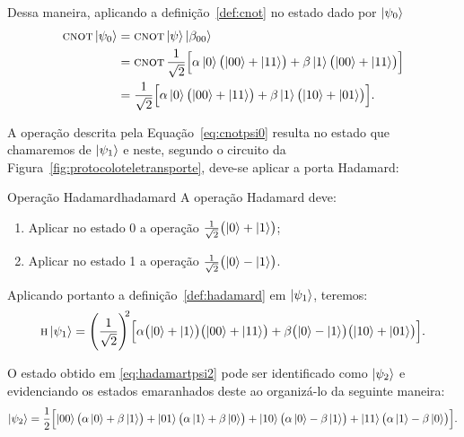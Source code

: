 Dessa maneira, aplicando a definição~\ref{def:cnot} no estado dado por $\ket{\psi_0}$
\begin{align}\label{eq:cnotpsi0}
  \operatorname{\textsc{cnot}} \ket{\psi_0} &= \operatorname{\textsc{cnot}} \ket{\psi} \ket{\beta_{00}} \nonumber \\
                     &= \operatorname{\textsc{cnot}} \frac{1}{\sqrt{2}} \Bigl[ \alpha \ket{0} \bigl( \ket{00} + \ket{11} \bigr) + \beta \ket{1} \bigl( \ket{00} + \ket{11} \bigr)\Bigr] \nonumber \\
                     &= \frac{1}{\sqrt{2}} \Bigl[\alpha \ket{0} \bigl( \ket{00} + \ket{11} \bigr) + \beta \ket{1} \bigl( \ket{10} + \ket{01} \bigr) \Bigr].
\end{align}

A operação descrita pela Equação~\eqref{eq:cnotpsi0} resulta no estado que chamaremos de $\ket{\psi_1}$ e neste, segundo o circuito da Figura~\ref{fig:protocoloteletransporte}, deve-se aplicar a porta Hadamard:

\begin{theo}{Operação Hadamard}{hadamard}
  A operação Hadamard deve:
  \begin{enumerate}[label=\roman*.]
    \item Aplicar no estado 0 a operação $\frac{1}{\sqrt{2}} \bigl(\ket{0}+\ket{1}\bigr)$;
    \item Aplicar no estado 1 a operação $\frac{1}{\sqrt{2}} \bigl(\ket{0}-\ket{1}\bigr)$.
  \end{enumerate}
\end{theo}

Aplicando portanto a definição~\ref{def:hadamard} em $\ket{\psi_1}$, teremos:
\begin{equation}\label{eq:hadamartpsi2}
 \operatorname{\textsc{h}} \ket{\psi_1} = \Biggl( \frac{1}{\sqrt{2}}\Biggr)^{\!\!2} \Bigl[ \alpha \bigl( \ket{0} + \ket{1} \bigr)\bigl( \ket{00} +\ket{11} \bigr)+ \beta \bigl( \ket{0} - \ket{1} \bigr) \bigl( \ket{10} + \ket{01} \bigr) \Bigr].
\end{equation}

O estado obtido em \eqref{eq:hadamartpsi2} pode ser identificado como $\ket{\psi_2}$ e evidenciando os estados emaranhados deste ao organizá-lo da seguinte maneira:
\begin{equation}\label{eq:psi2}
 \ket{\psi_2} = \frac{1}{2} \Bigl[ \ket{00} \bigl( \alpha \ket{0} + \beta \ket{1} \bigr) + \ket{01} \bigl( \alpha \ket{1} + \beta \ket{0} \bigr) + \ket{10} \bigl( \alpha \ket{0} - \beta \ket{1} \bigr) + \ket{11} \bigl( \alpha \ket{1} - \beta \ket{0} \bigr) \Bigr].
\end{equation}

